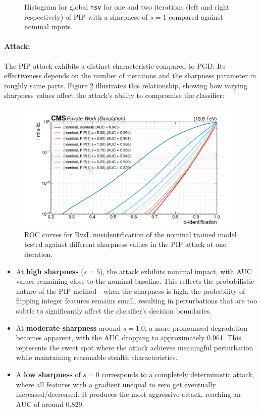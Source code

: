 \begin{figure}[htbp]
  \caption{Histogram for global \texttt{nsv} for one and two iterations (left and right respectively) of PIP with a sharpness of $s=1$ compared against nominal inputs.}
  \label{fig:intprob_severity_vtxAss}
\end{figure}

\newpage
\paragraph{Attack:} The PIP attack exhibits a distinct characteristic compared to PGD. Its effectiveness depends on the number of iterations and the sharpness parameter in roughly same parts. Figure \ref{fig:intprob_rocs_vs_sharpness} illustrates this relationship, showing how varying sharpness values affect the attack's ability to compromise the classifier:

\begin{figure}[H]
\centering
    \includegraphics[width=15cm]{media/output/roc_bvsl_intprob_sharpness.pdf}
    \caption{ROC curves for BvsL misidentification of the nominal trained model tested against different sharpness values in the PIP attack at one iteration.}
    \label{fig:intprob_rocs_vs_sharpness}
\end{figure}

\begin{itemize}
    \item At \textbf{high sharpness} ($s = 5$), the attack exhibits minimal impact, with AUC values remaining close to the nominal baseline. This reflects the probabilistic nature of the PIP method—when the sharpness is high, the probability of flipping integer features remains small, resulting in perturbations that are too subtle to significantly affect the classifier's decision boundaries.
    \item At \textbf{moderate sharpness} around $s = 1.0$, a more pronounced degradation becomes apparent, with the AUC dropping to approximately 0.961. This represents the sweet spot where the attack achieves meaningful perturbation while maintaining reasonable stealth characteristics. 
    \item A \textbf{low sharpness} of $s = 0$ corresponds to a completely deterministic attack, where all features with a gradient unequal to zero get eventually increased/decreased. It produces the most aggressive attack, reaching an AUC of around 0.829.
\end{itemize}


